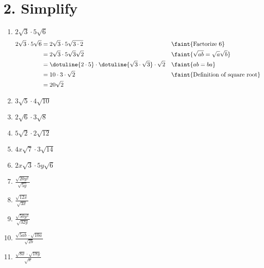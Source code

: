 \documentclass{hw}
\begin{document}
\section*{\normalsize 2. Simplify}
    \begin{enumerate}[label=\alph*.]
        \item $2\sqrt{3} \cdot 5\sqrt{6}$
            \textcolor{blue}{
            \begin{align*}
                2\sqrt{3} \cdot 5\sqrt{6} &= 2\sqrt{3} \cdot 5\sqrt{3 \cdot 2} & \leaders\hbox{A}\hfill & \faint{\text{Factorize } 6} \\
                                          &= 2\sqrt{3} \cdot 5\sqrt{3}\sqrt{2} && \faint{\sqrt{ab} = \sqrt{a}\sqrt{b}} \\
                                          &= \dotuline{2 \cdot 5} \cdot \dotuline{\sqrt{3} \cdot \sqrt{3}} \cdot \sqrt{2} && \faint{ab=ba} \\
                                          &= 10 \cdot 3 \cdot \sqrt{2} && \faint{\text{Definition of square root}} \\
                                          &= 20 \sqrt{2}
            \end{align*}
            }
        \item $3\sqrt{5} \cdot 4\sqrt{10}$
            \studentxlargeworkspace
        \item $2\sqrt{6} \cdot 3\sqrt{8}$
            \studentxlargeworkspace
        \item $5\sqrt{2} \cdot 2\sqrt{12}$
            \studentxlargeworkspace
        \item $4x\sqrt{7} \cdot 3\sqrt{14}$
            \studentxlargeworkspace
        \item $2x\sqrt{3} \cdot 5y\sqrt{6}$
            \studentxlargeworkspace
        \item $\frac{\sqrt{20y^2}}{\sqrt{5y}}$
            \studentxlargeworkspace
        \item $\frac{\sqrt{12x}}{\sqrt{3x}}$
            \studentxlargeworkspace
        \item $\frac{\sqrt{50y^3}}{\sqrt{32y}}$
            \studentxlargeworkspace
        \item $\frac{\sqrt{5ab} \cdot \sqrt{10a}}{\sqrt{2b}}$
            \studentxlargeworkspace
        \item $\frac{\sqrt{8x} \cdot \sqrt{18y}}{\sqrt{x}}$
            \studentxlargeworkspace
    \end{enumerate} 
\end{document}
